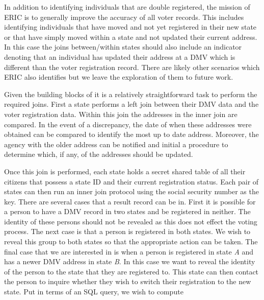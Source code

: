 In addition to identifying individuals that are double registered, the mission of ERIC is to generally improve the accuracy of all voter records. This includes identifying individuals that have moved and not yet registered in their new state or that have simply moved within a state and not updated their current address. In this case the joins between/within states should also include an indicator denoting that an individual has updated their address at a DMV which is different than the voter registration record. There are likely other scenarios which ERIC also identifies but we leave the exploration of them to future work.

Given the building blocks of  it is a relatively straightforward task to perform the required joins. First a state performs a left join between their DMV data and the voter registration data. Within this join the addresses in the inner join are compared. In the event of a discrepancy, the date of when these addresses were obtained can be compared to identify the most up to date address. Moreover, the agency with the older address can be notified and initial a procedure to determine which, if any, of the addresses should be updated. 


Once this join is performed, each state holds a secret shared table of all their citizens that possess a state ID and their current registration status. Each pair of states can then run an inner join protocol using the social security number as the key. There are several cases that a result record can be in. First it is possible for a person to have a DMV record in two states and be registered in neither. The identity of these persons should not be revealed as this does not effect the voting process. The next case is that a person is registered in both states. We wish to reveal this group to both states so that the appropriate action can be taken. The final case that we are interested in is when a person is registered in state \emph{A} and has a newer DMV address in state \emph{B}. In this case we want to reveal the identity of the person to the state that they are registered to. This state can then contact the person to inquire whether they wish to switch their registration to the new state. Put in terms of an SQL query, we wish to compute 

